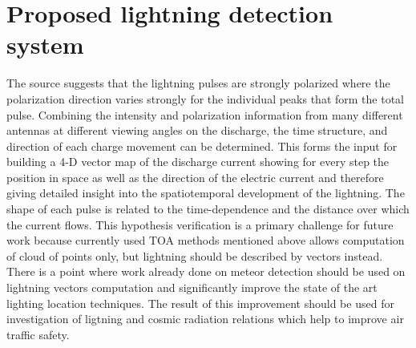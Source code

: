 \documentclass[twoside]{ctuthesis}
\theoremstyle{plain}
\theoremstyle{definition}
\theoremstyle{note}
\begin{document}
\section{Proposed lightning detection system}
The source \cite{LOFAR_lightning} suggests that the lightning pulses are strongly polarized where the polarization direction varies strongly for the individual peaks that form the total pulse. Combining the intensity and polarization information from many different antennas at different viewing angles on the discharge, the time structure, and direction of each charge movement can be determined.  This forms the input for building a 4-D vector map of the discharge current showing for every step the position in space as well as the direction of the electric current and therefore giving detailed insight into the spatiotemporal development of the lightning.  The shape of each pulse is related to the time-dependence and the distance over which the current flows.
This hypothesis verification is a primary challenge for future work because currently used TOA methods mentioned above allows computation of cloud of points only, but lightning should be described by vectors instead. There is a point where work already done on meteor detection should be used on lightning vectors computation and significantly improve the state of the art lighting location techniques. The result of this improvement should be used for investigation of ligtning and cosmic radiation relations which help to improve air traffic safety. 

\appendix
\end{document}

